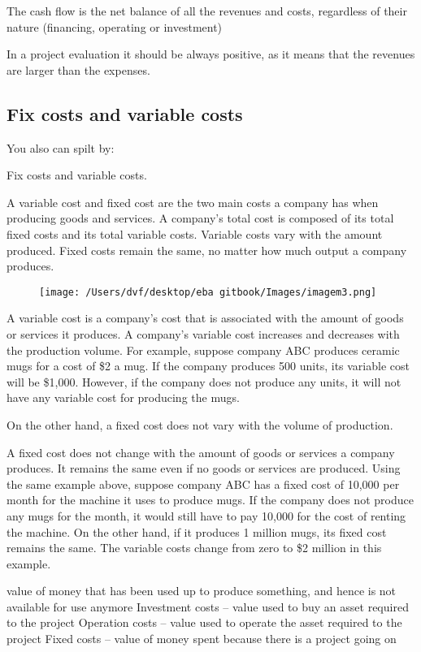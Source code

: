 \documentclass[]{book}
\theoremstyle{definition}
\theoremstyle{definition}
\theoremstyle{definition}
\theoremstyle{remark}
\begin{document}
The cash flow is the net balance of all the revenues and costs,
regardless of their nature (financing, operating or investment)

In a project evaluation it should be always positive, as it means that
the revenues are larger than the expenses.

\subsection{Fix costs and variable
costs}\label{fix-costs-and-variable-costs}

You also can spilt by:

Fix costs and variable costs.

A variable cost and fixed cost are the two main costs a company has when
producing goods and services. A company's total cost is composed of its
total fixed costs and its total variable costs. Variable costs vary with
the amount produced. Fixed costs remain the same, no matter how much
output a company produces.

\begin{figure}[htbp]
\centering
\texttt{[image: /Users/dvf/desktop/eba gitbook/Images/imagem3.png]}
\caption{}
\end{figure}

A variable cost is a company's cost that is associated with the amount
of goods or services it produces. A company's variable cost increases
and decreases with the production volume. For example, suppose company
ABC produces ceramic mugs for a cost of \$2 a mug. If the company
produces 500 units, its variable cost will be \$1,000. However, if the
company does not produce any units, it will not have any variable cost
for producing the mugs.

On the other hand, a fixed cost does not vary with the volume of
production.

A fixed cost does not change with the amount of goods or services a
company produces. It remains the same even if no goods or services are
produced. Using the same example above, suppose company ABC has a fixed
cost of 10,000 per month for the machine it uses to produce mugs. If the
company does not produce any mugs for the month, it would still have to
pay 10,000 for the cost of renting the machine. On the other hand, if it
produces 1 million mugs, its fixed cost remains the same. The variable
costs change from zero to \$2 million in this example.

value of money that has been used up to produce something, and hence is
not available for use anymore Investment costs -- value used to buy an
asset required to the project Operation costs -- value used to operate
the asset required to the project Fixed costs -- value of money spent
because there is a project going on
\end{document}
